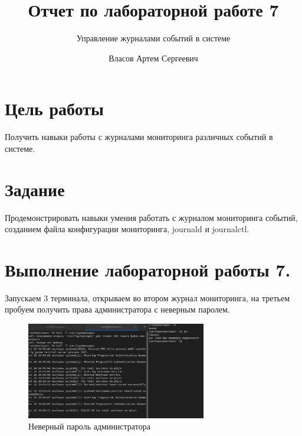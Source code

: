 \documentclass[
  12pt,
  a4paper,
  DIV=11,
  numbers=noendperiod]{scrreprt}
\title{Отчет по лабораторной работе 7}
\subtitle{Управление журналами событий в системе}
\author{Власов Артем Сергеевич}
\date{}
\renewcommand*\contentsname{Содержание}
\newcommand\contentsname{Содержание}
\begin{document}
\maketitle

\renewcommand*\contentsname{Содержание}
{
\setcounter{tocdepth}{1}
\tableofcontents
}
\listoffigures
\listoftables
{}
\chapter{Цель
работы}\label{ux446ux435ux43bux44c-ux440ux430ux431ux43eux442ux44b}

Получить навыки работы с журналами мониторинга различных событий в
системе.

\chapter{Задание}\label{ux437ux430ux434ux430ux43dux438ux435}

Продемонстрировать навыки умения работать с журналом мониторинга
событий, созданием файла конфигурации мониторинга, journald и
journalctl.

\chapter{Выполнение лабораторной работы
7.}\label{ux432ux44bux43fux43eux43bux43dux435ux43dux438ux435-ux43bux430ux431ux43eux440ux430ux442ux43eux440ux43dux43eux439-ux440ux430ux431ux43eux442ux44b-7.}

Запускаем 3 терминала, открываем во втором журнал мониторинга, на
третьем пробуем получить права администратора с неверным паролем.

\begin{figure}

{\centering \includegraphics[width=0.7\textwidth,height=\textheight]{image/1.png}

}

\caption{Неверный пароль администратора}

\end{figure}%
\end{document}
